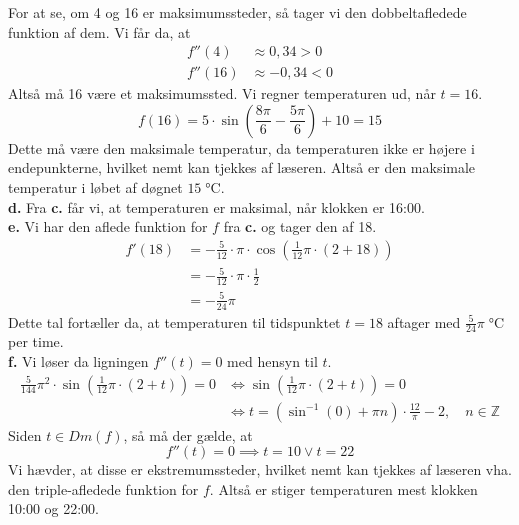 \documentclass{article}
\begin{document}
For at se, om 4 og 16 er maksimumssteder, så tager vi den dobbeltafledede funktion af dem. 
Vi får da, at
\begin{equation*}
\begin{split}
  f''(4) &\approx 0,34 >0 \\ 
  f''(16) &\approx -0,34 < 0
\end{split}
\end{equation*}
Altså må 16 være et maksimumssted. 
Vi regner temperaturen ud, når $t=16$.
\[
f(16)= 5 \cdot \sin \left(\frac{8\pi}{6}-\frac{5\pi}{6}\right)+10 = 15
\] 
Dette må være den maksimale temperatur, da temperaturen ikke er højere i endepunkterne, hvilket nemt kan tjekkes af læseren.
Altså er den maksimale temperatur i løbet af døgnet $15 \;\unit{\celsius} $. \\[1ex]
\textbf{d.} Fra \textbf{c.} får vi, at temperaturen er maksimal, når klokken er 16:00. \\[1ex]
\textbf{e.} Vi har den aflede funktion for $f$ fra \textbf{c.} og tager den af 18.
\begin{equation*}
\begin{split}
  f'(18)&=- \frac{5}{12} \cdot \pi \cdot \cos \left(\frac{1}{12}\pi \cdot (2+18)\right)\\ 
  &=- \frac{5}{12} \cdot \pi \cdot \frac{1}{2} \\
  &=-\frac{5}{24}\pi
\end{split}
\end{equation*}
Dette tal fortæller da, at temperaturen til tidspunktet $t=18$ aftager med $\frac{5}{24}\pi \;\unit{\celsius} $ per time. \\[1ex]
\textbf{f.}  
Vi løser da ligningen $f''(t)=0$ med hensyn til $t$.
\begin{equation*}
\begin{split}
  \frac{5}{144} \pi^2\cdot \sin\left(\frac{1}{12}\pi \cdot (2+t)\right)=0 &\iff \sin\left(\frac{1}{12}\pi \cdot (2+t)\right)=0 \\ 
  &\iff t=\left(\sin^{-1}(0)+\pi n\right) \cdot \frac{12}{\pi}-2, \quad n \in \mathbb{Z}
\end{split}
\end{equation*}
Siden $t \in Dm(f)$, så må der gælde, at
\[
f''(t)=0 \implies t=10 \lor t=22
\] 
Vi hævder, at disse er ekstremumssteder, hvilket nemt kan tjekkes af læseren vha. den triple-afledede funktion for $f$.
Altså er stiger temperaturen mest klokken 10:00 og 22:00.
\end{document}
